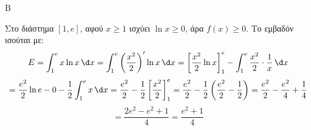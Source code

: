 \begin{thema}{Β}
\begin{erwthma}
\item Στο διάστημα $[1, e]$, αφού $x \ge 1$ ισχύει $\ln x \ge 0$, άρα $f(x) \ge 0$. Το εμβαδόν ισούται με:
\[ E = \int_1^e x \ln x\,\d x = \int_1^e \left(\frac{x^2}{2}\right)' \ln x\,\d x = \left[ \frac{x^2}{2} \ln x \right]_1^e - \int_1^e \frac{x^2}{2} \cdot \frac{1}{x}\,\d x \]
\[ = \frac{e^2}{2} \ln e - 0 - \frac{1}{2} \int_1^e x\,\d x = \frac{e^2}{2} - \frac{1}{2} \left[ \frac{x^2}{2} \right]_1^e = \frac{e^2}{2} - \frac{1}{2} \left( \frac{e^2}{2} - \frac{1}{2} \right) = \frac{e^2}{2} - \frac{e^2}{4} + \frac{1}{4} \]
\[ = \frac{2e^2 - e^2 + 1}{4} = \frac{e^2+1}{4} \]
\end{erwthma}
\end{thema}
